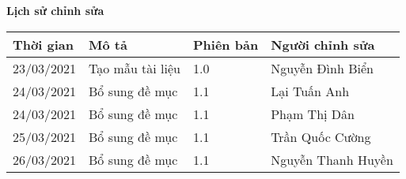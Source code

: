 \documentclass[./main.tex]{subfiles}
\begin{document}
	\begin{center}
		\Large{\textbf{Lịch sử chỉnh sửa}}
		\begin{table}[H]
		\begin{tabular}{|p{}|p{}|p{}|p{}|}
				\hline
				\textbf{Thời gian} & \textbf{Mô tả}   & \textbf{Phiên bản} & \textbf{Người chỉnh sửa}                                                 \\ \hline
				23/03/2021 & Tạo mẫu tài liệu & 1.0 & Nguyễn Đình Biển   \\ \hline
				24/03/2021 & Bổ sung đề mục   & 1.1 & Lại Tuấn Anh       \\ \hline
				24/03/2021 & Bổ sung đề mục   & 1.1 & Phạm Thị Dân       \\ \hline
				25/03/2021 & Bổ sung đề mục   & 1.1 & Trần Quốc Cường    \\ \hline
				26/03/2021 & Bổ sung đề mục   & 1.1 & Nguyễn Thanh Huyền \\ \hline
				
			\end{tabular}
		\end{table}
	\end{center}
	
\end{document}
